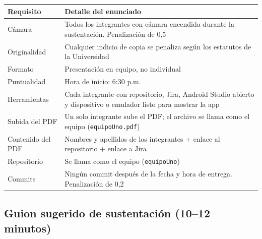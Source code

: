\documentclass[11pt,letterpaper]{article}
\newcommand{\code}[1]{\texttt{\small #1}}
\begin{document}
\begin{center}
\small
\begin{xltabular}{\linewidth}{@{}l X@{}}
\toprule
\textbf{Requisito} & \textbf{Detalle del enunciado}\\
\midrule
\endhead
\bottomrule
\endlastfoot
C\'amara & Todos los integrantes con c\'amara encendida durante la sustentaci\'on. Penalizaci\'on de 0,5\\
Originalidad & Cualquier indicio de copia se penaliza seg\'un los estatutos de la Universidad\\
Formato & Presentaci\'on en equipo, no individual\\
Puntualidad & Hora de inicio: 6:30 p.m.\\
Herramientas & Cada integrante con repositorio, Jira, Android Studio abierto y dispositivo o emulador listo para mostrar la app\\
Subida del PDF & Un solo integrante sube el PDF; el archivo se llama como el equipo (\code{equipoUno.\allowbreak{}pdf})\\
Contenido del PDF & Nombres y apellidos de los integrantes + enlace al repositorio + enlace a Jira\\
Repositorio & Se llama como el equipo (\code{equipoUno})\\
Commits & Ning\'un commit despu\'es de la fecha y hora de entrega. Penalizaci\'on de 0,2\\
\end{xltabular}
\end{center}

\subsection{Guion sugerido de sustentaci\'on (10--12 minutos)}
\end{document}
